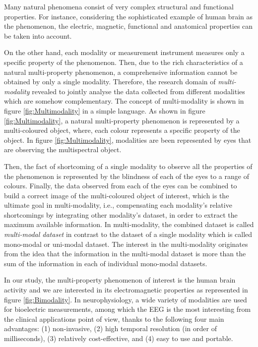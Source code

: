 Many natural phenomena consist of very complex structural and functional properties.
For instance, considering the sophisticated example of human brain as the phenomenon, the electric, magnetic, functional and anatomical properties can be taken into account.

On the other hand, each modality or measurement instrument measures only a specific property of the phenomenon.
Then, due to the rich characteristics of a natural multi-property phenomenon, a comprehensive information cannot be obtained by only a single modality.
Therefore, the research domain of \emph{multi-modality} revealed to jointly analyse the data collected from different modalities which are somehow complementary.
The concept of multi-modality is shown in figure \ref{fig:Multimodality} in a simple language.
As shown in figure \ref{fig:Multimodality}, a natural multi-property phenomenon is represented by a multi-coloured object, where, each colour represents a specific property of the object.
In figure \ref{fig:Multimodality}, modalities are been represented by eyes that are observing the multispectral object.

Then, the fact of shortcoming of a single modality to observe all the properties of the phenomenon is represented by the blindness of each of the eyes to a range of colours.
Finally, the data observed from each of the eyes can be combined to build a correct image of the multi-coloured object of interest, which is the ultimate goal in multi-modality, i.e., compensating each modality’s relative shortcomings by integrating other modality's dataset, in order to extract the maximum available information.
In multi-modality, the combined dataset is called \emph{multi-modal dataset} in contrast to the dataset of a single modality which is called mono-modal or uni-modal dataset.
The interest in the multi-modality originates from the idea that the information in the multi-modal dataset is more than the sum of the information in each of individual mono-modal datasets.

In our study, the multi-property phenomenon of interest is the human brain activity and we are interested in its electromagnetic properties as represented in figure \ref{fig:Bimodality}.
In neurophysiology, a wide variety of modalities are used for bioelectric measurements, among which the EEG is the most interesting from the clinical applications point of view, thanks to the following four main advantages: (1) non-invasive, (2) high temporal resolution (in order of milliseconds), (3) relatively cost-effective, and (4) easy to use and portable.  

